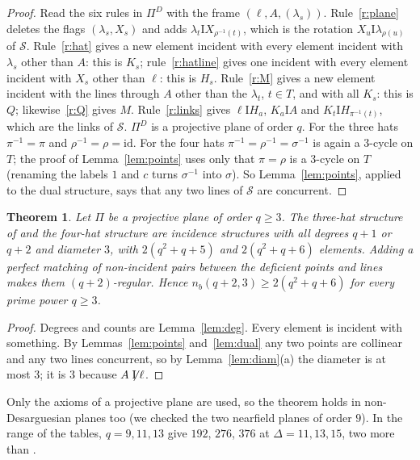 \documentclass[11pt]{amsart}
\newtheorem{theorem}{Theorem}[section]
\theoremstyle{definition}
\theoremstyle{remark}
\newcommand{\I}{\mathrel{\mathrm{I}}}
\newcommand{\nI}{\mathrel{\not\mathrel{\mathrm{I}}}}
\newcommand{\cS}{\mathcal{S}}
\newcommand{\lam}{\lambda}
\begin{document}
\begin{proof}
Read the six rules in $\Pi^D$ with the frame $(\ell,A,(\lam_s))$. Rule~\ref{r:plane} deletes the flags $(\lam_s,X_s)$ and adds $\lam_t\I X_{\rho^{-1}(t)}$, which is the rotation $X_u\I\lam_{\rho(u)}$ of $\cS$. Rule~\ref{r:hat} gives a new element incident with every element incident with $\lam_s$ other than $A$: this is $K_s$; rule~\ref{r:hatline} gives one incident with every element incident with $X_s$ other than $\ell$: this is $H_s$. Rule~\ref{r:M} gives a new element incident with the lines through $A$ other than the $\lam_t$, $t\in T$, and with all $K_s$: this is $Q$; likewise~\ref{r:Q} gives $M$. Rule~\ref{r:links} gives $\ell\I H_a$, $K_a\I A$ and $K_t\I H_{\pi^{-1}(t)}$, which are the links of $\cS$. $\Pi^D$ is a projective plane of order $q$. For the three hats $\pi^{-1}=\pi$ and $\rho^{-1}=\rho=\mathrm{id}$. For the four hats $\pi^{-1}=\rho^{-1}=\sigma^{-1}$ is again a $3$-cycle on $T$; the proof of Lemma~\ref{lem:points} uses only that $\pi=\rho$ is a $3$-cycle on $T$ (renaming the labels $1$ and $c$ turns $\sigma^{-1}$ into $\sigma$). So Lemma~\ref{lem:points}, applied to the dual structure, says that any two lines of $\cS$ are concurrent.
\end{proof}

\begin{theorem}\label{thm:hats}
Let $\Pi$ be a projective plane of order $q\ge 3$. The three-hat structure of \cite{AL20} and the four-hat structure are incidence structures with all degrees $q+1$ or $q+2$ and diameter $3$, with $2(q^2+q+5)$ and $2(q^2+q+6)$ elements. Adding a perfect matching of non-incident pairs between the deficient points and lines makes them $(q+2)$-regular. Hence $n_b(q+2,3)\ge 2(q^2+q+6)$ for every prime power $q\ge 3$.
\end{theorem}

\begin{proof}
Degrees and counts are Lemma~\ref{lem:deg}. Every element is incident with something. By Lemmas~\ref{lem:points} and~\ref{lem:dual} any two points are collinear and any two lines concurrent, so by Lemma~\ref{lem:diam}(a) the diameter is at most $3$; it is $3$ because $A\nI\ell$.
\end{proof}

Only the axioms of a projective plane are used, so the theorem holds in non-Desarguesian planes too (we checked the two nearfield planes of order $9$). In the range of the tables, $q=9,11,13$ give $192$, $276$, $376$ at $\Delta=11,13,15$, two more than \cite{AL20}.
\end{document}
